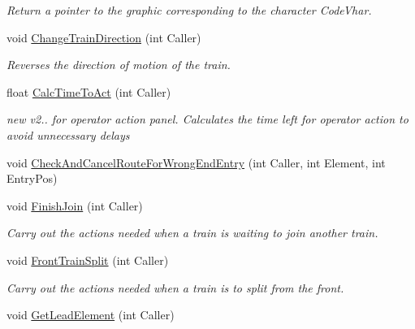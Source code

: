 \begin{DoxyCompactItemize}
\begin{DoxyCompactList}\small\item\em Return a pointer to the graphic corresponding to the character \textquotesingle{}Code\+Vhar\textquotesingle{}. \end{DoxyCompactList}\item 
\mbox{\label{class_t_train_a406c172a0ba96802ada1aa04d78948d0}} 
void \mbox{\hyperlink{class_t_train_a406c172a0ba96802ada1aa04d78948d0}{Change\+Train\+Direction}} (int Caller)
\begin{DoxyCompactList}\small\item\em Reverses the direction of motion of the train. \end{DoxyCompactList}\item 
float \mbox{\hyperlink{class_t_train_ae34370de578ebd07a217c79d8b67312c}{Calc\+Time\+To\+Act}} (int Caller)
\begin{DoxyCompactList}\small\item\em new v2.. for operator action panel. Calculates the time left for operator action to avoid unnecessary delays \end{DoxyCompactList}\item 
void \mbox{\hyperlink{class_t_train_a50997f7e8138a7e6a147fe3b5ad21b84}{Check\+And\+Cancel\+Route\+For\+Wrong\+End\+Entry}} (int Caller, int Element, int Entry\+Pos)
\item 
\mbox{\label{class_t_train_ab9edf458753619f8cd25f0165484d26f}} 
void \mbox{\hyperlink{class_t_train_ab9edf458753619f8cd25f0165484d26f}{Finish\+Join}} (int Caller)
\begin{DoxyCompactList}\small\item\em Carry out the actions needed when a train is waiting to join another train. \end{DoxyCompactList}\item 
\mbox{\label{class_t_train_ad666fb061d1da7c44a72ec963c2098aa}} 
void \mbox{\hyperlink{class_t_train_ad666fb061d1da7c44a72ec963c2098aa}{Front\+Train\+Split}} (int Caller)
\begin{DoxyCompactList}\small\item\em Carry out the actions needed when a train is to split from the front. \end{DoxyCompactList}\item 
void \mbox{\hyperlink{class_t_train_a0675ea1dede706d5b0dd52264496865a}{Get\+Lead\+Element}} (int Caller)

\end{DoxyCompactItemize}
